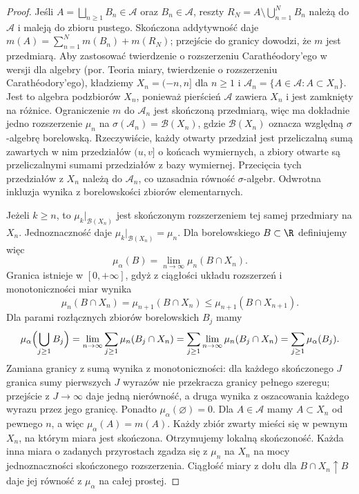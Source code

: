 \begin{proof}
Jeśli $A=\bigsqcup_{n\ge1}B_n\in\mathcal A$ oraz $B_n\in\mathcal A$, reszty $R_N=A\setminus\bigcup_{n=1}^N B_n$ należą do $\mathcal A$ i maleją do zbioru pustego. Skończona addytywność daje $m(A)=\sum_{n=1}^N m(B_n)+m(R_N)$; przejście do granicy dowodzi, że $m$ jest przedmiarą. Aby zastosować twierdzenie o rozszerzeniu Carathéodory'ego
w wersji dla algebry (por. 
{Teoria miary, twierdzenie o rozszerzeniu Carathéodory'ego}),
kładziemy $X_n=(-n,n]$ dla $n\ge1$ i
$\mathcal A_n=\{A\in\mathcal A:A\subset X_n\}$.
Jest to algebra podzbiorów $X_n$, ponieważ pierścień
$\mathcal A$ zawiera $X_n$ i jest zamknięty na różnice.
Ograniczenie $m$ do $\mathcal A_n$ jest skończoną
przedmiarą, więc ma dokładnie jedno rozszerzenie
$\mu_n$ na $\sigma(\mathcal A_n)=\mathcal B(X_n)$,
gdzie $\mathcal B(X_n)$ oznacza względną
$\sigma$-algebrę borelowską.
Rzeczywiście, każdy otwarty przedział jest
przeliczalną sumą zawartych w nim przedziałów
$(u,v]$ o końcach wymiernych, a zbiory otwarte są
przeliczalnymi sumami przedziałów z bazy wymiernej.
Przecięcia tych przedziałów z $X_n$ należą do
$\mathcal A_n$, co uzasadnia równość
$\sigma$-algebr. Odwrotna inkluzja wynika
z borelowskości zbiorów elementarnych.

Jeżeli $k\ge n$, to $\mu_k|_{\mathcal B(X_n)}$
jest skończonym rozszerzeniem tej samej przedmiary
na $X_n$. Jednoznaczność daje
$\mu_k|_{\mathcal B(X_n)}=\mu_n$. Dla borelowskiego
$B\subset\R$ definiujemy więc
\[
 \mu_\alpha(B)=\lim_{n\to\infty}\mu_n(B\cap X_n).
\]
Granica istnieje w $[0,+\infty]$, gdyż z ciągłości
układu rozszerzeń i monotoniczności miar wynika
\[
 \mu_n(B\cap X_n)=\mu_{n+1}(B\cap X_n)
 \le\mu_{n+1}(B\cap X_{n+1}).
\]
Dla parami rozłącznych zbiorów borelowskich $B_j$
mamy
\[
 \mu_\alpha\Bigl(\bigcup_{j\ge1}B_j\Bigr)
 =\lim_{n\to\infty}\sum_{j\ge1}\mu_n(B_j\cap X_n)
 =\sum_{j\ge1}\lim_{n\to\infty}\mu_n(B_j\cap X_n)
 =\sum_{j\ge1}\mu_\alpha(B_j).
\]
Zamiana granicy z sumą wynika z monotoniczności:
dla każdego skończonego $J$ granica sumy pierwszych
$J$ wyrazów nie przekracza granicy pełnego szeregu;
przejście z $J\to\infty$ daje jedną nierówność,
a druga wynika z oszacowania każdego wyrazu
przez jego granicę. Ponadto $\mu_\alpha(\varnothing)=0$.
Dla $A\in\mathcal A$ mamy $A\subset X_n$ od
pewnego $n$, a więc $\mu_\alpha(A)=m(A)$.
Każdy zbiór zwarty mieści się w pewnym $X_n$,
na którym miara jest skończona. Otrzymujemy
lokalną skończoność. Każda inna miara o zadanych
przyrostach zgadza się z $\mu_n$ na $X_n$ na mocy
jednoznaczności skończonego rozszerzenia.
Ciągłość miary z dołu dla $B\cap X_n\uparrow B$
daje jej równość z $\mu_\alpha$ na całej prostej.


\end{proof}
